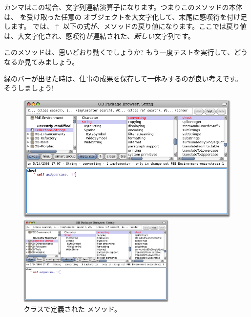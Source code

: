 \documentclass[a4paper,10pt,twoside]{book}
\begin{document}
カンマはこの場合、文字列連結演算子になります。つまりこのメソッドの本体は、 を受け取った任意の  オブジェクトを大文字化して、末尾に感嘆符を付け足します。
\pharo では、$\uparrow$ 以下の式が、メソッドの戻り値になります。ここでは戻り値は、大文字化され、感嘆符が連結された、\emph{新しい}文字列です。

このメソッドは、思いどおり動くでしょうか? もう一度テストを実行して、どうなるか見てみましょう。

緑のバーが出せた時は、仕事の成果を保存して一休みするのが良い考えです。
そうしましょう!

\begin{figure}[hbt]
\ifluluelse
	{\centerline{\includegraphics[width=\textwidth]{String-Shout}}}
	{\centerline{\includegraphics[width=0.7\textwidth]{String-Shout}}}
\caption{ クラスで定義された  メソッド。
}
\end{figure}
\end{document}
